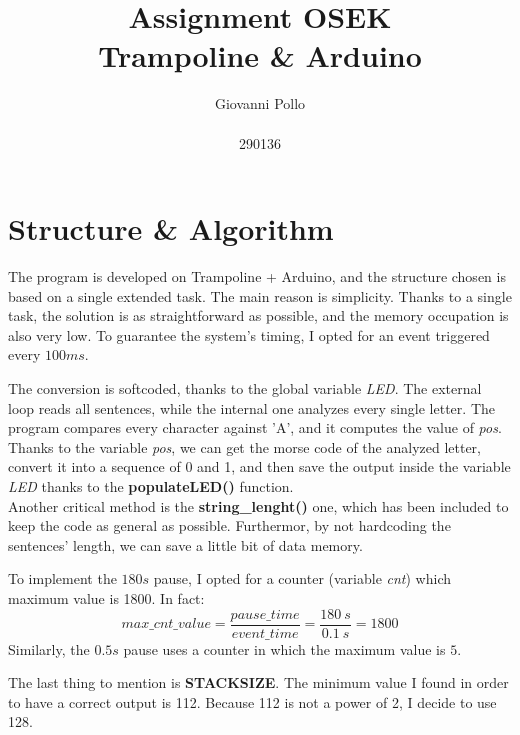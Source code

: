\documentclass[a4paper]{article}
\title{\Huge Assignment OSEK \\ \LARGE Trampoline \& Arduino}
\author{\huge Giovanni Pollo \\ \\ \huge 290136}
\date{}
\begin{document}
\begin{titlepage}
  \centering
  \vspace{2px}
\end{titlepage}
\maketitle




\newpage


\section{Structure \& Algorithm}
The program is developed on Trampoline + Arduino, and the structure chosen is based on a single extended task. The main reason is simplicity. Thanks to a single task, the solution is as straightforward as possible, and the memory occupation is also very low. To guarantee the system's timing, I opted for an event triggered every \(100ms\).

The conversion is softcoded, thanks to the global variable \emph{LED}. The external loop reads all sentences, while the internal one analyzes every single letter. The program compares every character against 'A', and it computes the value of \emph{pos}. \\
Thanks to the variable \emph{pos}, we can get the morse code of the analyzed letter, convert it into a sequence of 0 and 1, and then save the output inside the variable \emph{LED} thanks to the \textbf{populateLED()} function. \\
Another critical method is the \textbf{string\_lenght()} one, which has been included to keep the code as general as possible. Furthermor, by not hardcoding the sentences' length, we can save a little bit of data memory.
\newline

To implement the \(180s\) pause, I opted for a counter (variable \emph{cnt}) which maximum value is 1800. In fact:
\begin{equation}
  max\_cnt\_value = \frac{pause\_time}{event\_time} = \frac{180\ s}{0.1\ s} = 1800
\end{equation}
Similarly, the \(0.5s\) pause uses a counter in which the maximum value is \(5\).
\newline

The last thing to mention is \textbf{STACKSIZE}. The minimum value I found in order to have a correct output is 112. Because 112 is not a power of 2, I decide to use 128.
\end{document}

